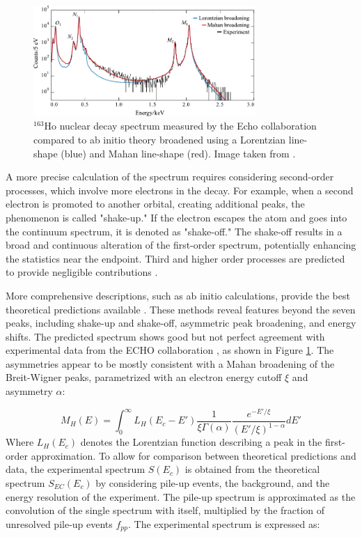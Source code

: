 \begin{figure}[t]
  \centering
  \includegraphics[width=0.75\textwidth]{figures/ch1/mahan.pdf}
  \caption{$^{163}$Ho nuclear decay spectrum measured by the Echo collaboration compared to ab initio theory broadened
  using a Lorentzian line-shape (blue) and Mahan line-shape (red). Image taken from  \cite{velte2019high}.}
  \label{fig:mahan}
\end{figure}


A more precise calculation of the spectrum requires considering second-order processes, which involve more electrons in the
decay. For example, when a second electron is promoted to another orbital, creating additional peaks, the phenomenon is
called "shake-up." If the electron escapes the atom and goes into the continuum spectrum, it is denoted as "shake-off."
The shake-off results in a broad and continuous alteration of the first-order spectrum, potentially enhancing the
statistics near the endpoint. Third and higher order processes are predicted to provide negligible
contributions \cite{thirdorder}.

More comprehensive descriptions, such as ab initio calculations, provide the best theoretical predictions available \cite{brass2018ab}. These methods reveal features beyond
the seven peaks, including shake-up and shake-off, asymmetric peak broadening, and energy shifts. The predicted
spectrum shows good but not perfect agreement with experimental data from the ECHO collaboration \cite{velte2019high}, as
shown in Figure \ref{fig:mahan}. The asymmetries appear to be mostly consistent with a Mahan broadening of the Breit-Wigner peaks, parametrized with an electron energy cutoff \(\xi\) and asymmetry \(\alpha\):

\begin{equation}
M_H(E) = \int_{0}^{\infty} L_H(E_c - E') \frac{1}{\xi \Gamma(\alpha)} \frac{e^{-E'/\xi}}{(E'/\xi)^{1-\alpha}} dE'
\end{equation}
Where \(L_H(E_c)\) denotes the Lorentzian function describing a peak in the first-order approximation. 
To allow for comparison between theoretical predictions and data, the experimental spectrum \(S(E_c)\) is obtained from
the theoretical spectrum \(S_{EC}(E_c)\) by considering pile-up events, the background, and the energy resolution of the
experiment. The pile-up spectrum is approximated as the convolution of the single spectrum with itself, multiplied by the fraction of unresolved pile-up events \(f_{pp}\). The experimental spectrum is expressed as:

